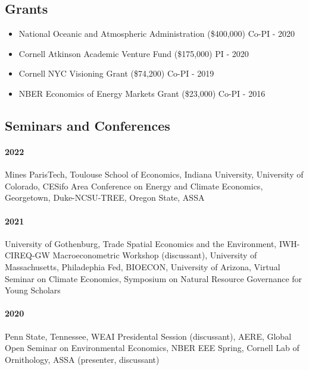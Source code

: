 \documentclass[12pt]{res} %
\begin{document}
\begin{resume}
\vspace{-.2in}

\subsection{Grants}
\begin{itemize}  \itemsep -1pt
	\item[] National Oceanic and Atmospheric Administration (\$400,000) \hfill Co-PI - 2020
	\item[] Cornell Atkinson Academic Venture Fund (\$175,000) \hfill PI - 2020
	\item[] Cornell NYC Visioning Grant (\$74,200) \hfill Co-PI - 2019
	\item[] NBER Economics of Energy Markets Grant (\$23,000) \hfill Co-PI - 2016
\end{itemize}

\vspace{-.2in}

\subsection{Seminars and Conferences}\vspace{-.1in}
\paragraph{2022} Mines ParisTech, Toulouse School of Economics, Indiana University, University of Colorado, CESifo Area Conference on Energy and Climate Economics, Georgetown, Duke-NCSU-TREE, Oregon State, ASSA \vspace{-.2in}
\paragraph{2021} University of Gothenburg, Trade Spatial Economics and the Environment, IWH-CIREQ-GW Macroeconometric Workshop (discussant), University of Massachusetts, Philadephia Fed, BIOECON, University of Arizona, Virtual Seminar on Climate Economics, Symposium on Natural Resource Governance for Young Scholars \vspace{-.2in}
\paragraph{2020} Penn State, Tennessee, WEAI Presidental Session (discussant), AERE, Global Open Seminar on Environmental Economics, NBER EEE Spring, Cornell Lab of Ornithology, ASSA (presenter, discussant) \vspace{-.2in}

\end{resume}
\end{document}
